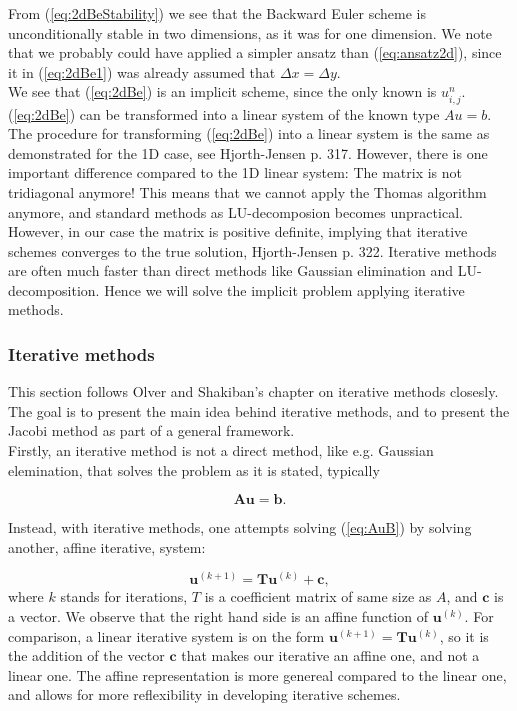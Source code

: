 \documentclass{article}
\begin{document}
From (\ref{eq:2dBeStability}) we see that the Backward Euler scheme is unconditionally stable in two dimensions, as it was for one dimension. We note that we probably could have applied a simpler ansatz than (\ref{eq:ansatz2d}), since it in (\ref{eq:2dBe1}) was already assumed that $\Delta x = \Delta y$.\\

We see that (\ref{eq:2dBe}) is an implicit scheme, since the only known is $u_{i,j}^n$. (\ref{eq:2dBe}) can be transformed into a linear system of the known type $Au = b$. The procedure for transforming (\ref{eq:2dBe}) into a linear system is the same as demonstrated for the 1D case, see Hjorth-Jensen \cite{MHJ} p. 317. However, there is one important difference compared to the 1D linear system: The matrix is not tridiagonal anymore! This means that we cannot apply the Thomas algorithm anymore, and standard methods as LU-decomposion becomes unpractical. However, in our case the matrix is positive definite, implying that iterative schemes converges to the true solution, Hjorth-Jensen \cite{MHJ} p. 322. Iterative methods are often much faster than direct methods like Gaussian elimination and LU-decomposition. Hence we will solve the implicit problem applying iterative methods. 

\subsubsection{Iterative methods}
This section follows Olver and Shakiban's \cite{olver} chapter on iterative methods closesly. The goal is to present the main idea behind iterative methods, and to present the Jacobi method as part of a general framework.\\

Firstly, an iterative method is not a direct method, like e.g. Gaussian elemination, that solves the problem as it is stated, typically 

\begin{equation}\label{eq:AuB}
	\mathbf{A}\mathbf{u} = \mathbf{b}.
\end{equation} 

Instead, with iterative methods, one attempts solving (\ref{eq:AuB}) by solving another, affine iterative, system:

\begin{equation}\label{eq:iter1}
	\mathbf{u}^{(k+1)} = \mathbf{T} \mathbf{u}^{(k)} + \mathbf{c},
\end{equation}
where $k$ stands for iterations, $T$ is a coefficient matrix of same size as $A$, and $\mathbf{c}$ is a vector. We observe that the right hand side is an affine function of $\mathbf{u}^{(k)}$. For comparison, a linear iterative system is on the form $\mathbf{u}^{(k+1)} = \mathbf{T} \mathbf{u}^{(k)}$, so it is the addition of the vector $\mathbf{c}$ that makes our iterative an affine one, and not a linear one. The affine representation is more genereal compared to the linear one, and allows for more reflexibility in developing iterative schemes.\\
\end{document}
